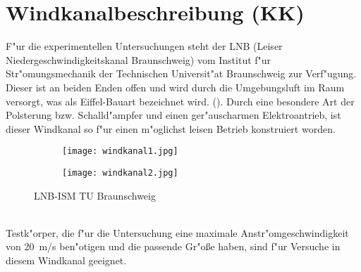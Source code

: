 \clearpage




\section{Windkanalbeschreibung (KK)}
F"ur die experimentellen Untersuchungen steht der LNB (Leiser Niedergeschwindigkeitskanal Braunschweig) vom Institut f"ur Str"omungsmechanik der Technischen  Universit"at Braunschweig zur Verf"ugung.\\
Dieser ist an beiden Enden offen und wird durch die Umgebungsluft im Raum versorgt, was als Eiffel-Bauart bezeichnet wird. ().
Durch eine besondere Art der Polsterung bzw. Schalld"ampfer und einen
ger"auscharmen Elektroantrieb, ist dieser Windkanal so f"ur einen m"oglichst leisen Betrieb konstruiert worden.
\begin{figure}[h]
	\centering
	\begin{subfigure}[c]{0.6\textwidth}		
		\texttt{[image: windkanal1.jpg]}
	\end{subfigure}
	\begin{subfigure}[c]{0.6\textwidth}
		\texttt{[image: windkanal2.jpg]}
	\end{subfigure}
	\caption{LNB-ISM TU Braunschweig}
	\label{fig:windkanal}
\end{figure}\\
Testk"orper, die f"ur die Untersuchung eine maximale Anstr"omgeschwindigkeit von \SI{20}{\meter/\second} ben"otigen und die passende Gr"o\ss{}e haben, sind f"ur Versuche in diesem Windkanal geeignet.

